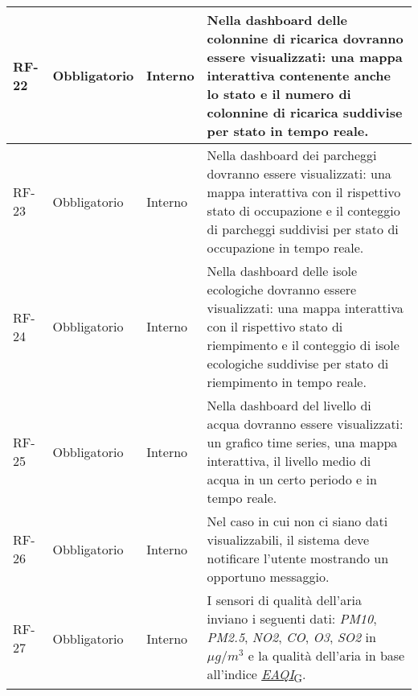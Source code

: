\begin{longtable}{|>{\centering\arraybackslash}m{}|>{\centering\arraybackslash}m{}|>{\centering\arraybackslash}m{}|>{\centering\arraybackslash}m{}|}
	RF-22           & Obbligatorio        & Interno        & Nella dashboard delle colonnine di ricarica dovranno essere visualizzati: una mappa interattiva contenente anche lo stato e il numero di colonnine di ricarica suddivise per stato in tempo reale.                                                                                                                                                                               \\\hline
	RF-23           & Obbligatorio        & Interno        & Nella dashboard dei parcheggi dovranno essere visualizzati: una mappa interattiva con il rispettivo stato di occupazione e il conteggio di parcheggi suddivisi per stato di occupazione in tempo reale.                                                                                                                                                                          \\\hline
	RF-24           & Obbligatorio        & Interno        & Nella dashboard delle isole ecologiche dovranno essere visualizzati: una mappa interattiva con il rispettivo stato di riempimento e il conteggio di isole ecologiche suddivise per stato di riempimento in tempo reale.                                                                                                                                                          \\\hline
	RF-25           & Obbligatorio        & Interno        & Nella dashboard del livello di acqua dovranno essere visualizzati: un grafico time series, una mappa interattiva, il livello medio di acqua in un certo periodo e in tempo reale.                                                                                                                                                                                                \\\hline
	RF-26           & Obbligatorio        & Interno        & Nel caso in cui non ci siano dati visualizzabili, il sistema deve notificare l'utente mostrando un opportuno messaggio.                                                                                                                                                                                                                                                          \\\hline
	RF-27           & Obbligatorio        & Interno        & I sensori di qualità dell'aria inviano i seguenti dati: \textit{PM10}, \textit{PM2.5}, \textit{NO2}, \textit{CO}, \textit{O3}, \textit{SO2} in $\mu g/m^3$ e la qualità dell'aria in base all'indice \href{https://7last.github.io/docs/rtb/documentazione-interna/glossario\#european-air-quality-index}{\textit{EAQI}\textsubscript{G}}.                                       \\\hline

\end{longtable}
